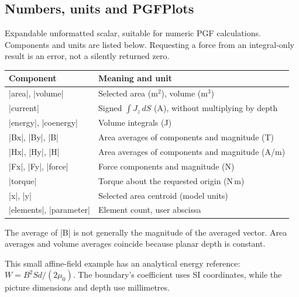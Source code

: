 \subsection{Numbers, units and PGFPlots}
\begin{command}{\femmresult{}}
Expandable unformatted scalar, suitable for numeric PGF calculations. Components
and units are listed below. Requesting a force from an integral-only result is
an error, not a silently returned zero.
\end{command}
\begin{center}\begin{tabular}{ll}\toprule
Component & Meaning and unit\\\midrule
|area|, |volume| & Selected area (m$^2$), volume (m$^3$)\\
|current| & Signed $\int J_z\,dS$ (A), without multiplying by depth\\
|energy|, |coenergy| & Volume integrals (J)\\
|Bx|, |By|, |B| & Area averages of components and magnitude (T)\\
|Hx|, |Hy|, |H| & Area averages of components and magnitude (A/m)\\
|Fx|, |Fy|, |force| & Force components and magnitude (N)\\
|torque| & Torque about the requested origin (N\,m)\\
|x|, |y| & Selected area centroid (model units)\\
|elements|, |parameter| & Element count, user abscissa\\\bottomrule
\end{tabular}\end{center}
The average of |B| is not generally the magnitude of the averaged vector.
Area averages and volume averages coincide because planar depth is constant.

This small affine-field example has an analytical energy reference:
$W=B^2 Sd/(2\mu_0)$. The boundary's coefficient uses SI coordinates, while
the picture dimensions and depth use millimetres.
\begin{codeexample}[width=5cm]
\end{codeexample}

